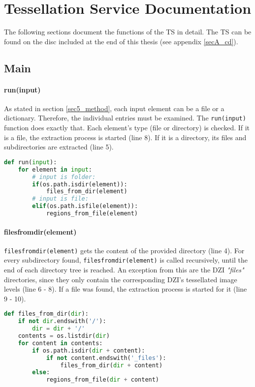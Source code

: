 \chapter{Tessellation Service Documentation}
\label{secC}
The following sections document the functions of the TS in detail. The TS can be found on the disc included at the end of this thesis (see appendix \ref{secA_cd}).

\section{Main}

\subsubsection{run(input)}
As stated in section \ref{sec5_method}, each input element can be a file or a dictionary. Therefore, the individual entries must be examined. The \texttt{run(input)} function does exactly that. Each element's type (file or directory) is checked. If it is a file, the extraction process is started (line 8). If it is a directory, its files and subdirectories are extracted (line 5).

\begin{lstlisting}[frame=single,language=python]
def run(input):
	for element in input:
		# input is folder:
		if(os.path.isdir(element)):
			files_from_dir(element)
		# input is file:
		elif(os.path.isfile(element)):
			regions_from_file(element)
\end{lstlisting}


\subsubsection{files{\textunderscore}from{\textunderscore}dir(element)}
\texttt{files{\textunderscore}from{\textunderscore}dir(element)} gets the content of the provided directory (line 4). For every subdirectory found, \texttt{files{\textunderscore}from{\textunderscore}dir(element)} is called recursively, until the end of each directory tree is reached. An exception from this are the DZI \emph{"{\textunderscore}files"} directories, since they only contain the corresponding DZI's tessellated image levels (line 6 - 8). If a file was found, the extraction process is started for it (line 9 - 10).

\begin{lstlisting}[frame=single,language=python]
def files_from_dir(dir):
	if not dir.endswith('/'):
		dir = dir + '/'
	contents = os.listdir(dir)
	for content in contents:
		if os.path.isdir(dir + content):
			if not content.endswith('_files'):
				files_from_dir(dir + content)
		else:
			regions_from_file(dir + content)
\end{lstlisting}


